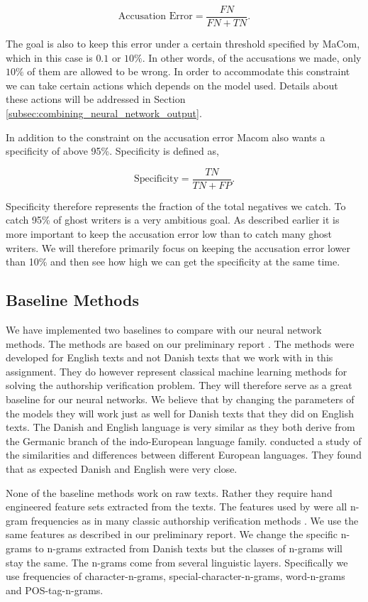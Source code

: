 \begin{equation}
    \text{Accusation Error} = \frac{FN}{FN + TN}.
\end{equation}

The goal is also to keep this error under a certain threshold specified
by MaCom, which in this case is $0.1$ or $10\%$. In other words, of the
accusations we made, only $10\%$ of them are allowed to be wrong. In order
to accommodate this constraint we can take certain actions which depends on
the model used. Details about these actions will be addressed in Section
\ref{subsec:combining_neural_network_output}.

In addition to the constraint on the accusation error Macom also wants a
specificity of above 95\%. Specificity is defined as,

\begin{equation}
    \text{Specificity} = \frac{TN}{TN + FP}.
\end{equation}

Specificity therefore represents the fraction of the total negatives we catch.
To catch 95\% of ghost writers is a very ambitious goal. As described earlier it
is more important to keep the accusation error low than to catch many ghost
writers. We will therefore primarily focus on keeping the accusation error lower
than 10\% and then see how high we can get the specificity at the same time.

\subsection{Baseline Methods}

We have implemented two baselines to compare with our neural network methods.
The methods are based on our preliminary report \citep{US}. The methods were
developed for English texts and not Danish texts that we work with in this
assignment. They do however represent classical machine learning methods for
solving the authorship verification problem. They will therefore serve as
a great baseline for our neural networks. We believe that by changing the
parameters of the models they will work just as well for Danish texts that they
did on English texts. The Danish and English language is very similar as they
both derive from the Germanic branch of the indo-European language family.
\citet{konstantin:2000} conducted a study of the similarities and differences
between different European languages. They found that as expected Danish and
English were very close.

None of the baseline methods work on raw texts. Rather they require hand
engineered feature sets extracted from the texts. The features used by
\citet{US} were all n-gram frequencies as in many classic authorship
verification methods \citep{stamatos2009}. We use the same features as
described in our preliminary report. We change the specific n-grams to
n-grams extracted from Danish texts but the classes of n-grams will stay the
same. The n-grams come from several linguistic layers. Specifically we use
frequencies of character-n-grams, special-character-n-grams, word-n-grams and
\gls{POS}-tag-n-grams.

